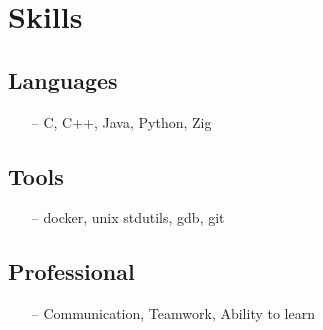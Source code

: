 \documentclass[11pt]{article}
\begin{document}
\section{Skills}
\begin{multicols}{2}
	\subsection{Languages}
	\begin{itemize}[noitemsep, topsep=0pt]
		\item[--] C, C++, Java, Python, Zig
	\end{itemize}
	\subsection{Tools}
	\begin{itemize}[noitemsep, topsep=0pt]
		\item[--] docker, unix stdutils, gdb, git
	\end{itemize}
	\subsection{Professional}
	\begin{itemize}[noitemsep, topsep=0pt]
		\item[--] Communication, Teamwork, Ability to learn
	\end{itemize}
\end{multicols}
\end{document}
